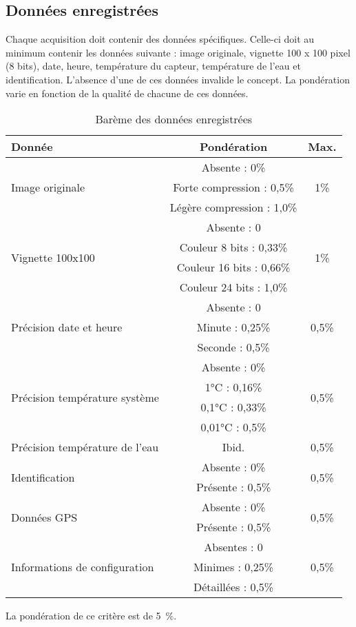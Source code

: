

\subsection{Données enregistrées}
\label{s:cdc_pdd_donnees_enre}

Chaque acquisition doit contenir des données spécifiques.
Celle-ci doit au minimum contenir les données suivante : image originale, vignette 100 x 100 pixel (8 bits), date, heure, température du capteur, température de l’eau et identification.
L’absence d’une de ces données invalide le concept.
La pondération varie en fonction de la qualité de chacune de ces données.


\begin{table}[H]
	\caption{Barème des données enregistrées}
	\label{tab:cdc_pdd_donnees_enre}
	\centering
	\begin{tabular}{|l|c|c|}
		\hline
		Donnée & Pondération & Max. \\\hline
		\multirow{3}{*}{Image originale} & Absente : 0\% & \multirow{3}{*}{1\%} \\
		& Forte compression : 0,5\% & \\
		& Légère compression : 1,0\% & \\\hline
		\multirow{4}{*}{Vignette 100x100} & Absente : 0 & \multirow{4}{*}{1\%} \\
		& Couleur 8 bits : 0,33\% & \\
		& Couleur 16 bits : 0,66\% & \\
		& Couleur 24 bits : 1,0\% & \\\hline
		\multirow{3}{*}{Précision date et heure} & Absente : 0 & \multirow{3}{*}{0,5\%} \\
		& Minute : 0,25\% & \\
		& Seconde : 0,5\% & \\\hline
		\multirow{4}{*}{Précision température système} & Absente : 0\% & \multirow{4}{*}{0,5\%} \\
		& 1°C : 0,16\% & \\
		& 0,1°C : 0,33\% & \\
		& 0,01°C : 0,5\% & \\\hline
		Précision température de l’eau & Ibid. & 0,5\% \\\hline
		\multirow{2}{*}{Identification} & Absente : 0\% & \multirow{2}{*}{0,5\%} \\
		& Présente : 0,5\% & \\\hline
		\multirow{2}{*}{Données GPS} & Absente : 0\% & \multirow{2}{*}{0,5\%} \\
		& Présente : 0,5\% & \\\hline
		\multirow{3}{*}{Informations de configuration} & Absentes : 0 & \multirow{3}{*}{0,5\%} \\
		& Minimes : 0,25\% & \\
		& Détaillées : 0,5\% & \\\hline
	\end{tabular}
\end{table}

La pondération de ce critère est de 5~\%.